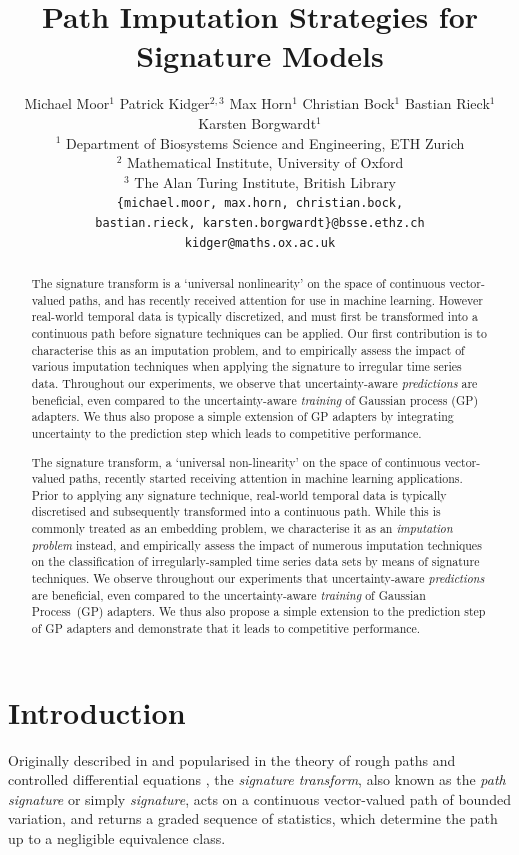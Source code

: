 \documentclass{article}
\title{Path Imputation Strategies for Signature Models}
\author{
    Michael Moor$^1$
    \And
	Patrick Kidger$^{2, 3}$
	\And
	Max Horn$^1$
	\And
	Christian Bock$^1$
	\And
	Bastian Rieck$^1$
	\And
	Karsten Borgwardt$^1$
	\AND \\[-12pt]
	\null$^1$ Department of Biosystems Science and Engineering, ETH Zurich
	\\
	\null$^2$ Mathematical Institute, University of Oxford \\
	\null$^3$ The Alan Turing Institute, British Library
	\\
	\hspace{-6.5em}\texttt{\{michael.moor, max.horn, christian.bock,}
	\\
	\hspace{6.5em}\texttt{bastian.rieck, karsten.borgwardt\}@\hspace{0.1pt}bsse.ethz.ch}
	\\
	\texttt{kidger@\hspace{0.1pt}maths.ox.ac.uk}
} %
\begin{document}
\maketitle

\begin{abstract}
The signature transform is a `universal nonlinearity' on the space of continuous vector-valued paths, and has recently received attention for use in machine learning. However real-world temporal data is typically discretized, and must first be transformed into a continuous path before signature techniques can be applied. %
Our first contribution is to characterise this as an imputation problem, and to empirically assess the impact of various imputation techniques when applying the signature to irregular time series data. Throughout our experiments, we observe that uncertainty-aware \emph{predictions} are beneficial, even compared to the uncertainty-aware \emph{training} of Gaussian process (GP) adapters. We thus also propose a simple extension of GP adapters by integrating uncertainty to the prediction step which leads to competitive performance.
\end{abstract} %

\begin{abstract}
The signature transform, a `universal non-linearity' on the space of
continuous vector-valued paths, recently started receiving attention in
machine learning applications. Prior to applying any signature technique,
real-world temporal data is typically discretised and
subsequently transformed into a continuous path. While this is commonly
treated as an embedding problem, we characterise it as an
\emph{imputation problem} instead, and empirically assess the impact of
numerous imputation techniques on the classification of
irregularly-sampled time series data sets by means of signature
techniques. We observe throughout our experiments that uncertainty-aware
\emph{predictions} are beneficial, even compared to the
uncertainty-aware \emph{training} of Gaussian Process~(GP) adapters. We
thus also propose a simple extension to the prediction step of GP
adapters and demonstrate that it leads to competitive performance.
\end{abstract}

\section{Introduction}\label{intro}
Originally described in \cite{Chen54, Chen57, Chen58} and popularised in the theory of rough paths and controlled differential equations \cite{lyons1998differential, FritzVictoir10, lyons2014rough}, the \emph{signature transform}, also known as the \emph{path signature} or simply \emph{signature}, acts on a continuous vector-valued path of bounded variation, and returns a graded sequence of statistics, which determine the path up to a negligible equivalence class.
\end{document}
